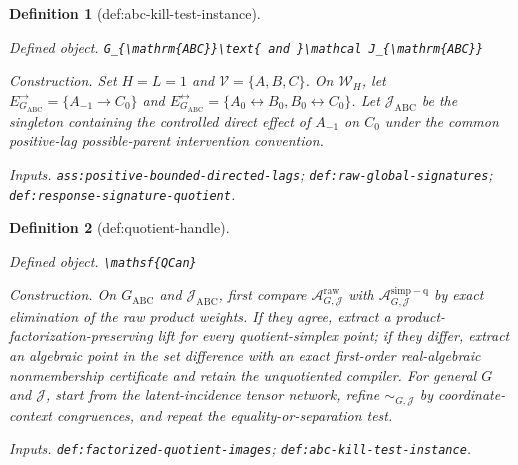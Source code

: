 \documentclass{article}
\newtheorem{definition}{Definition}
\begin{document}
\begin{definition}[def:abc-kill-test-instance]\label{def:abc-kill-test-instance}
\par\smallskip\noindent\emph{Defined object.} \texttt{G\_\allowbreak{}\{\textbackslash{}\allowbreak{}mathrm\{ABC\}\allowbreak{}\}\allowbreak{}\textbackslash{}\allowbreak{}text\{ and \}\allowbreak{}\textbackslash{}\allowbreak{}mathcal J\_\allowbreak{}\{\textbackslash{}\allowbreak{}mathrm\{ABC\}\allowbreak{}\}\allowbreak{}}
\par\smallskip\noindent\emph{Construction.} Set \(H=L=1\) and \(\mathcal V=\{A,B,C\}\). On \(\mathcal W_H\), let \(E_{G_{\mathrm{ABC}}}^{\to}=\{A_{-1}\to C_0\}\) and \(E_{G_{\mathrm{ABC}}}^{\leftrightarrow}=\{A_0\leftrightarrow B_0,B_0\leftrightarrow C_0\}\). Let \(\mathcal J_{\mathrm{ABC}}\) be the singleton containing the controlled direct effect of \(A_{-1}\) on \(C_0\) under the common positive-lag possible-parent intervention convention.
\par\smallskip\noindent\emph{Inputs.} \texttt{ass:\allowbreak{}positive-\allowbreak{}bounded-\allowbreak{}directed-\allowbreak{}lags}; \texttt{def:\allowbreak{}raw-\allowbreak{}global-\allowbreak{}signatures}; \texttt{def:\allowbreak{}response-\allowbreak{}signature-\allowbreak{}quotient}.
\end{definition}

\begin{definition}[def:quotient-handle]\label{def:quotient-handle}
\par\smallskip\noindent\emph{Defined object.} \texttt{\textbackslash{}\allowbreak{}mathsf\{QCan\}\allowbreak{}}
\par\smallskip\noindent\emph{Construction.} On \(G_{\mathrm{ABC}}\) and \(\mathcal J_{\mathrm{ABC}}\), first compare \(\mathcal A_{G,\mathcal J}^{\mathrm{raw}}\) with \(\mathcal A_{G,\mathcal J}^{\mathrm{simp-q}}\) by exact elimination of the raw product weights. If they agree, extract a product-factorization-preserving lift for every quotient-simplex point; if they differ, extract an algebraic point in the set difference with an exact first-order real-algebraic nonmembership certificate and retain the unquotiented compiler. For general \(G\) and \(\mathcal J\), start from the latent-incidence tensor network, refine \(\sim_{G,\mathcal J}\) by coordinate-context congruences, and repeat the equality-or-separation test.
\par\smallskip\noindent\emph{Inputs.} \texttt{def:\allowbreak{}factorized-\allowbreak{}quotient-\allowbreak{}images}; \texttt{def:\allowbreak{}abc-\allowbreak{}kill-\allowbreak{}test-\allowbreak{}instance}.
\end{definition}
\end{document}
